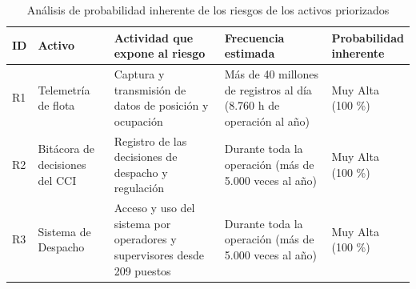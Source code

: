 \begin{table}[H]
    \centering
    \caption{Análisis de probabilidad inherente de los riesgos de los activos priorizados}
    \label{tab:probabilidad-inherente}
    \small
    \renewcommand{\arraystretch}{1.25}
    \setlength{\tabcolsep}{3pt}

    \begin{tabularx}{\textwidth}{
            @{}
            >{\centering\arraybackslash}p{0.8cm}
            >{\raggedright\arraybackslash}p{3cm}
            >{\raggedright\arraybackslash}X
            >{\raggedright\arraybackslash}p{3.3cm}
            >{\centering\arraybackslash}p{2.4cm}
            @{}
        }
        \toprule
        \textbf{ID}                                                              &
        \textbf{Activo}                                                          &
        \textbf{Actividad que expone al riesgo}                                  &
        \textbf{Frecuencia estimada}                                             &
        \makecell{\textbf{Probabilidad}\\\textbf{inherente}}                       \\
        \midrule

        R1                                                                       &
        Telemetría de flota                                                      &
        Captura y transmisión de datos de posición y ocupación                   &
        Más de 40 millones de registros al día (8.760 h de operación al año)     &
        \makecell{Muy Alta\\(100 \%)}                                              \\

        \midrule

        R2                                                                       &
        Bitácora de decisiones del CCI                                           &
        Registro de las decisiones de despacho y regulación                      &
        Durante toda la operación (más de 5.000 veces al año)                    &
        \makecell{Muy Alta\\(100 \%)}                                              \\

        \midrule

        R3                                                                       &
        Sistema de Despacho                                                      &
        Acceso y uso del sistema por operadores y supervisores desde 209 puestos &
        Durante toda la operación (más de 5.000 veces al año)                    &
        \makecell{Muy Alta\\(100 \%)}                                              \\


\end{tabularx}
\end{table}
